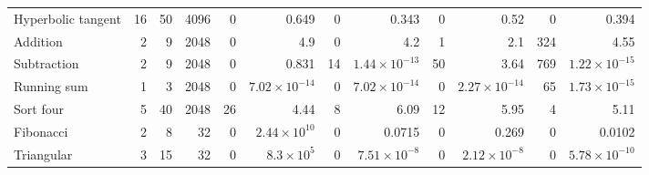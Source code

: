 \begin{table}[htbp]
\begin{tabular*}{\linewidth}{@{\extracolsep{\fill}}lrrr *{4}{rr}@{}}
\addlinespace[0.7pt]
Hyperbolic tangent & 16 & 50 & 4096 & 0 & 0.649 & 0 & 0.343 & 0 & 0.52 & 0 & 0.394 \\
\addlinespace[0.7pt]
Addition & 2 & 9 & 2048 & 0 & 4.9 & 0 & 4.2 & 1 & 2.1 & 324 & 4.55 \\
\addlinespace[0.7pt]
Subtraction & 2 & 9 & 2048 & 0 & 0.831 & 14 & $1.44\!\times\!10^{-13}$ & 50 & 3.64 & 769 & $1.22\!\times\!10^{-15}$ \\
\addlinespace[0.7pt]
Running sum & 1 & 3 & 2048 & 0 & $7.02\!\times\!10^{-14}$ & 0 & $7.02\!\times\!10^{-14}$ & 0 & $2.27\!\times\!10^{-14}$ & 65 & $1.73\!\times\!10^{-15}$ \\
\addlinespace[0.7pt]
Sort four & 5 & 40 & 2048 & 26 & 4.44 & 8 & 6.09 & 12 & 5.95 & 4 & 5.11 \\
\addlinespace[0.7pt]
Fibonacci & 2 & 8 & 32 & 0 & $2.44\!\times\!10^{10}$ & 0 & 0.0715 & 0 & 0.269 & 0 & 0.0102 \\
\addlinespace[0.7pt]
Triangular & 3 & 15 & 32 & 0 & $8.3\!\times\!10^{5}$ & 0 & $7.51\!\times\!10^{-8}$ & 0 & $2.12\!\times\!10^{-8}$ & 0 & $5.78\!\times\!10^{-10}$ \\
\bottomrule
\end{tabular*}\endgroup
\end{table}
